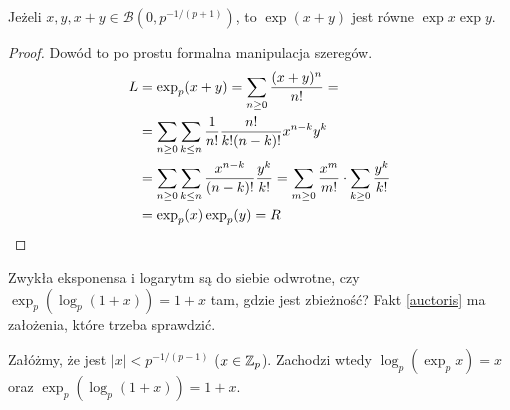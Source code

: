 \begin{fakt}
	Jeżeli $x, y, x+y \in \mathcal B(0, p^{-1/(p+1)})$, to $\exp(x+y)$ jest równe $\exp x \exp y$.
\end{fakt}

\begin{proof}
	Dowód to po prostu formalna manipulacja szeregów.
	\begin{align*}
		L & = \exp_p(x+y) = \sum_{n \ge 0} \frac{(x+y)^n}{n!} = \\
		& = \sum_{n \ge 0} \sum_{k \le n} \frac{1}{n!} \frac{n!}{k!(n-k)!} x^{n-k}y^k \\
		& = \sum_{n \ge 0} \sum_{k \le n} \frac{x^{n-k}}{(n-k)!} \frac{y^k}{k!} = \sum_{m \ge 0} \frac{x^m}{m!} \cdot \sum_{k \ge 0} \frac{y^k}{k!} \\
		& = \exp_p(x) \exp_p(y) = R\qedhere
	\end{align*}
\end{proof}

Zwykła eksponensa i logarytm są do siebie odwrotne, czy $\exp_p(\log_p(1+x)) = 1+x$ tam, gdzie jest zbieżność?
Fakt \ref{auctoris} ma założenia, które trzeba sprawdzić.

\begin{fakt}
	Załóżmy, że jest $|x| < p^{-1/(p-1)}$ ($x \in \mathbb Z_p$). Zachodzi wtedy $\log_p (\exp_p x) = x$ oraz $\exp_p(\log_p (1+x)) = 1 + x$.
\end{fakt}

